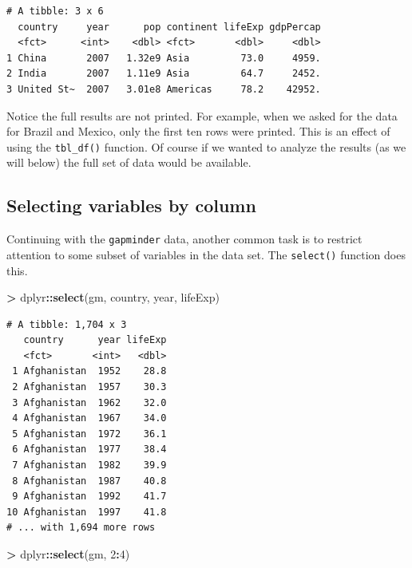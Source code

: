 \documentclass[]{krantz}
\makeatletter
\newenvironment{Shaded}{\begin{snugshade}}{\end{snugshade}}
\newcommand{\DecValTok}[1]{\textcolor[rgb]{0.06,0.06,0.06}{#1}}
\newcommand{\KeywordTok}[1]{\textcolor[rgb]{0.27,0.27,0.27}{\textbf{#1}}}
\newcommand{\NormalTok}[1]{#1}
\newcommand{\OperatorTok}[1]{\textcolor[rgb]{0.43,0.43,0.43}{\textbf{#1}}}
\newcommand{\StringTok}[1]{\textcolor[rgb]{0.5,0.5,0.5}{#1}}
\newenvironment{kframe}{%
\medskip{}
\setlength{\fboxsep}{.8em}
 \def\at@end@of@kframe{}%
 \ifinner\ifhmode%
  \def\at@end@of@kframe{\end{minipage}}%
  \begin{minipage}{\columnwidth}%
 \fi\fi%
 \def\FrameCommand##1{\hskip\@totalleftmargin \hskip-\fboxsep
 \colorbox{shadecolor}{##1}\hskip-\fboxsep
     \hskip-\linewidth \hskip-\@totalleftmargin \hskip\columnwidth}%
 \MakeFramed {\advance\hsize-\width
   \@totalleftmargin\z@ \linewidth\hsize
   \@setminipage}}%
 {\par\unskip\endMakeFramed%
 \at@end@of@kframe}
\renewenvironment{Shaded}{\begin{kframe}}{\end{kframe}}
\makeatother
\begin{document}
\begin{verbatim}
# A tibble: 3 x 6
  country     year      pop continent lifeExp gdpPercap
  <fct>      <int>    <dbl> <fct>       <dbl>     <dbl>
1 China       2007   1.32e9 Asia         73.0     4959.
2 India       2007   1.11e9 Asia         64.7     2452.
3 United St~  2007   3.01e8 Americas     78.2    42952.
\end{verbatim}

Notice the full results are not printed. For example, when we asked for the data for Brazil and Mexico, only the first ten rows were printed. This is an effect of using the \texttt{tbl\_df()} function. Of course if we wanted to analyze the results (as we will below) the full set of data would be available.

\hypertarget{selecting-variables-by-column}{%
\subsection{Selecting variables by column}\label{selecting-variables-by-column}}

Continuing with the \texttt{gapminder} data, another common task is to restrict attention to some subset of variables in the data set. The \texttt{select()} function does this.

\begin{Shaded}
\begin{Highlighting}[]
\OperatorTok{>}\StringTok{ }\NormalTok{dplyr}\OperatorTok{::}\KeywordTok{select}\NormalTok{(gm, country, year, lifeExp)}
\end{Highlighting}
\end{Shaded}

\begin{verbatim}
# A tibble: 1,704 x 3
   country      year lifeExp
   <fct>       <int>   <dbl>
 1 Afghanistan  1952    28.8
 2 Afghanistan  1957    30.3
 3 Afghanistan  1962    32.0
 4 Afghanistan  1967    34.0
 5 Afghanistan  1972    36.1
 6 Afghanistan  1977    38.4
 7 Afghanistan  1982    39.9
 8 Afghanistan  1987    40.8
 9 Afghanistan  1992    41.7
10 Afghanistan  1997    41.8
# ... with 1,694 more rows
\end{verbatim}

\begin{Shaded}
\begin{Highlighting}[]
\OperatorTok{>}\StringTok{ }\NormalTok{dplyr}\OperatorTok{::}\KeywordTok{select}\NormalTok{(gm, }\DecValTok{2}\OperatorTok{:}\DecValTok{4}\NormalTok{)}
\end{Highlighting}
\end{Shaded}
\end{document}
